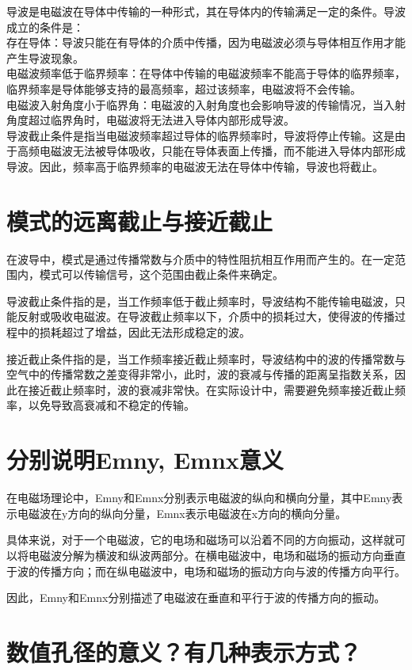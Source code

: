 \documentclass[12pt, a4paper, oneside]{article}
\begin{document}
\begin{spacing}{2.0}
导波是电磁波在导体中传输的一种形式，其在导体内的传输满足一定的条件。导波成立的条件是：
\\
存在导体：导波只能在有导体的介质中传播，因为电磁波必须与导体相互作用才能产生导波现象。
\\
电磁波频率低于临界频率：在导体中传输的电磁波频率不能高于导体的临界频率，临界频率是导体能够支持的最高频率，超过该频率，电磁波将不会传输。
\\
电磁波入射角度小于临界角：电磁波的入射角度也会影响导波的传输情况，当入射角度超过临界角时，电磁波将无法进入导体内部形成导波。
\\
导波截止条件是指当电磁波频率超过导体的临界频率时，导波将停止传输。这是由于高频电磁波无法被导体吸收，只能在导体表面上传播，而不能进入导体内部形成导波。因此，频率高于临界频率的电磁波无法在导体中传输，导波也将截止。

\section{模式的远离截止与接近截止 }
在波导中，模式是通过传播常数与介质中的特性阻抗相互作用而产生的。在一定范围内，模式可以传输信号，这个范围由截止条件来确定。

导波截止条件指的是，当工作频率低于截止频率时，导波结构不能传输电磁波，只能反射或吸收电磁波。在导波截止频率以下，介质中的损耗过大，使得波的传播过程中的损耗超过了增益，因此无法形成稳定的波。

接近截止条件指的是，当工作频率接近截止频率时，导波结构中的波的传播常数与空气中的传播常数之差变得非常小，此时，波的衰减与传播的距离呈指数关系，因此在接近截止频率时，波的衰减非常快。在实际设计中，需要避免频率接近截止频率，以免导致高衰减和不稳定的传输。


\section{分别说明Emny, Emnx意义  }
在电磁场理论中，Emny和Emnx分别表示电磁波的纵向和横向分量，其中Emny表示电磁波在y方向的纵向分量，Emnx表示电磁波在x方向的横向分量。

具体来说，对于一个电磁波，它的电场和磁场可以沿着不同的方向振动，这样就可以将电磁波分解为横波和纵波两部分。在横电磁波中，电场和磁场的振动方向垂直于波的传播方向；而在纵电磁波中，电场和磁场的振动方向与波的传播方向平行。

因此，Emny和Emnx分别描述了电磁波在垂直和平行于波的传播方向的振动。

\section{数值孔径的意义？有几种表示方式？}


\end{spacing}
\end{document}
